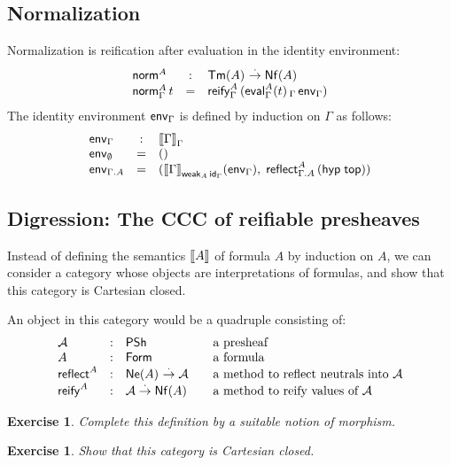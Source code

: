 \documentclass[a4paper]{article}
\newtheorem{exercise}[theorem]{Exercise}
\begin{document}
\subsection{Normalization}

Normalization is reification after evaluation in the identity
environment:
\[
\begin{array}{lcl}
\tnorm^A & : & \Tm A \todot \Nf A \\
\norm[\Gamma] A t & = & \reify[\Gamma]A {(\eval[\Gamma] A t \,_\Gamma\, \env[\Gamma])}
\end{array}
\]
The identity environment $\env[\Gamma]$ is defined by induction on
$\Gamma$ as follows:
\[
\begin{array}{lcl}
  \env[\Gamma] & : & \den \Gamma _\Gamma \\
  \env[\cempty] & = & () \\
  \env[\Gamma.A] & = & (\den\Gamma_{\weak[A] \id[\Gamma]}(\env[\Gamma]), \;
                          \reflect[\Gamma.A] A {(\hyp \ttop)})
\end{array}
\]

\subsection{Digression: The CCC of reifiable presheaves}

Instead of defining the semantics $\den A$ of formula $A$ by induction
on $A$, we can consider a category whose objects are interpretations
of formulas, and show that this category is Cartesian closed.

An object in this category would be a quadruple consisting of:
\[
\begin{array}{lll@{\qquad}l}
  \A & : & \PSh  & \mbox{a presheaf} \\
  A  & : & \Form & \mbox{a formula} \\
  \treflect^A & : & \Ne A \todot \A
    & \mbox{a method to reflect neutrals into $\A$} \\
  \treify^A & : & \A \todot \Nf A
    & \mbox{a method to reify values of $\A$} \\
\end{array}
\]
\begin{exercise}
  Complete this definition by a suitable notion of morphism.
\end{exercise}
\begin{exercise}
  Show that this category is Cartesian closed.
\end{exercise}


\end{document}
